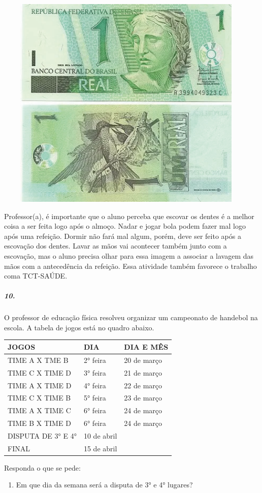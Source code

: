 \includegraphics[width=5.00000in,height=4.05208in]{media/image64.png}

Professor(a), é importante que o aluno perceba que escovar os dentes é a
melhor coisa a ser feita logo após o almoço. Nadar e jogar bola podem
fazer mal logo após uma refeição. Dormir não fará mal algum, porém, deve
ser feito após a escovação dos dentes. Lavar as mãos vai acontecer
também junto com a escovação, mas o aluno precisa olhar para essa imagem
a associar a lavagem das mãos com a antecedência da refeição. Essa
atividade também favorece o trabalho coma TCT-SAÚDE.

\subparagraph{10.}\label{section-51}

O professor de educação física resolveu organizar um campeonato de
handebol na escola. A tabela de jogos está no quadro abaixo.

\begin{longtable}[]{@{}lll@{}}
\toprule
JOGOS & DIA & DIA E MÊS\tabularnewline
\midrule
\endhead
TIME A X TME B & 2° feira & 20 de março\tabularnewline
TIME C X TIME D & 3° feira & 21 de março\tabularnewline
TIME A X TIME D & 4° feira & 22 de março\tabularnewline
TIME C X TIME B & 5° feira & 23 de março\tabularnewline
TIME A X TIME C & 6° feira & 24 de março\tabularnewline
TIME B X TIME D & 6° feira & 24 de março\tabularnewline
DISPUTA DE 3° E 4° & 10 de abril\tabularnewline
FINAL & 15 de abril\tabularnewline
\bottomrule
\end{longtable}

Responda o que se pede:

\begin{enumerate}
\def\labelenumi{\alph{enumi})}
\item
  Em que dia da semana será a disputa de 3° e 4° lugares?
\end{enumerate}

